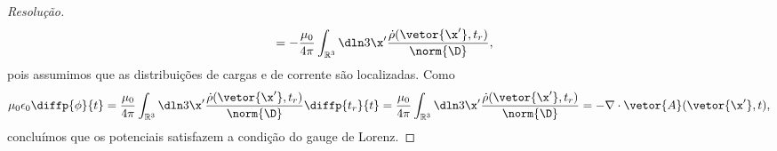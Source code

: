 \begin{proof}[Resolução]
\begin{align*}
                                             &= -\frac{\mu_0}{4\pi} \int_{\mathbb{R}^3} \dln3{\x'} \frac{\dot\rho(\vetor{\x'}, t_r)}{\norm{\D}},
    \end{align*}
    pois assumimos que as distribuições de cargas e de corrente são localizadas. Como
    \begin{equation*}
       \mu_0 \epsilon_0 \diffp{\phi}{t} = \frac{\mu_0}{4\pi} \int_{\mathbb{R}^3} \dln3{\x'} \frac{\dot\rho(\vetor{\x'}, t_r)}{\norm{\D}} \diffp{t_r}{t} = \frac{\mu_0}{4\pi}\int_{\mathbb{R}^3} \dln3{\x'} \frac{\dot\rho(\vetor{\x'}, t_r)}{\norm{\D}} = - \nabla\cdot \vetor{A}(\vetor{\x'}, t),
    \end{equation*}
    concluímos que os potenciais satisfazem a condição do gauge de Lorenz.
\end{proof}
